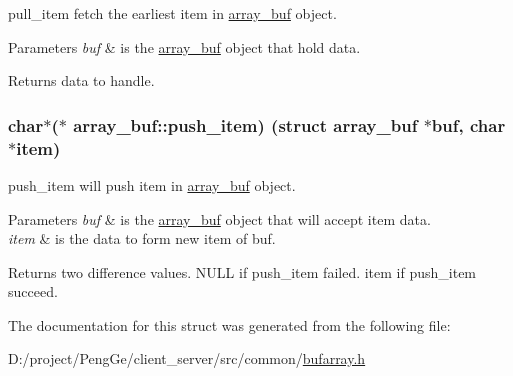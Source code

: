 pull\+\_\+item fetch the earliest item in \hyperlink{structarray__buf}{array\+\_\+buf} object. 


\begin{DoxyParams}{Parameters}
{\em buf} & is the \hyperlink{structarray__buf}{array\+\_\+buf} object that hold data.\\
\hline
\end{DoxyParams}
\begin{DoxyReturn}{Returns}
data to handle. 
\end{DoxyReturn}
\hypertarget{structarray__buf_ab90bdd641479ac916d653df2c3688ebf}{}
\subsubsection[{push\+\_\+item}]{\setlength{\rightskip}{0pt plus 5cm}char$\ast$($\ast$ array\+\_\+buf\+::push\+\_\+item) (struct {\bf array\+\_\+buf} $\ast$buf, char $\ast$item)}\label{structarray__buf_ab90bdd641479ac916d653df2c3688ebf}


push\+\_\+item will push item in \hyperlink{structarray__buf}{array\+\_\+buf} object. 


\begin{DoxyParams}{Parameters}
{\em buf} & is the \hyperlink{structarray__buf}{array\+\_\+buf} object that will accept item data. \\
\hline
{\em item} & is the data to form new item of buf.\\
\hline
\end{DoxyParams}
\begin{DoxyReturn}{Returns}
two difference values. N\+U\+L\+L if push\+\_\+item failed. item if push\+\_\+item succeed. 
\end{DoxyReturn}


The documentation for this struct was generated from the following file\+:\begin{DoxyCompactItemize}
\item 
D\+:/project/\+Peng\+Ge/client\+\_\+server/src/common/\hyperlink{bufarray_8h}{bufarray.\+h}\end{DoxyCompactItemize}
